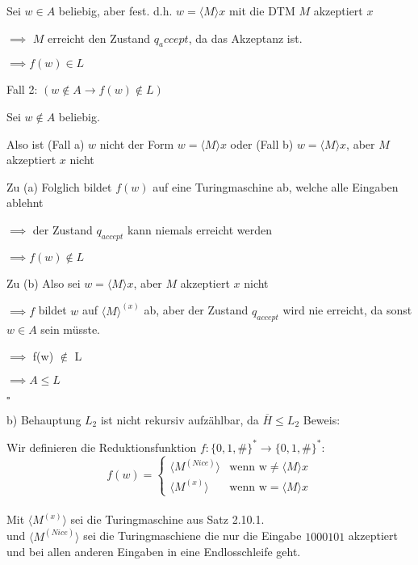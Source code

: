 \documentclass[a4paper,12pt]{article}
\newcommand{\qed}{\hfill$\square$}
\begin{document}
Sei $w \in A$ beliebig, aber fest. d.h. $w=\langle M\rangle x$ mit die DTM $M$ akzeptiert $x$

$\implies$ $M$ erreicht den Zustand $q_accept$, da das Akzeptanz ist.

$\implies f(w)\in L$

Fall 2: $(w \notin A \rightarrow f(w) \notin L)$

Sei $w \notin A$ beliebig.

Also ist (Fall a) $w$ nicht der Form $w=\langle M\rangle x$ oder (Fall b) $w=\langle M\rangle x$, aber $M$ akzeptiert $x$ nicht

Zu (a) Folglich bildet $f(w)$ auf eine Turingmaschine ab, welche alle Eingaben ablehnt

$\implies$ der Zustand $q_{accept}$ kann niemals erreicht werden

$\implies f(w) \notin L$

\vspace{0.5cm}

Zu (b) Also sei $w=\langle M\rangle x$, aber $M$ akzeptiert $x$ nicht

$\implies f$ bildet $w$ auf $\langle M\rangle ^{(x)}$ ab, aber der Zustand $q_{accept}$ wird nie erreicht, da sonst $w \in A$ sein müsste.

$\implies$ f(w) $\notin$ L

\vspace{1cm}

$\implies A \leq L$

\qed

\vspace{5cm}

b) Behauptung $L_2$ ist nicht rekursiv aufzählbar, da $\overline{H} \leq L_2$
Beweis:

Wir definieren die Reduktionsfunktion $f: \{0,1,\#\}^* \rightarrow \{0,1,\#\}^*$: \\

$$f(w)=\begin{cases}
    \langle M^{(Nice)} \rangle & \text{wenn w} \neq \langle M \rangle x \\
    \langle M^{(x)}\rangle     & \text{wenn w} = \langle M \rangle x
  \end{cases}$$ \\

Mit $\langle M^{(x)}\rangle$ sei die Turingmaschine aus Satz 2.10.1. \\
und $\langle M^{(Nice)} \rangle$ sei die Turingmaschiene die nur die Eingabe $1000101$ akzeptiert und bei allen anderen Eingaben in eine Endlosschleife geht. \\
\end{document}
